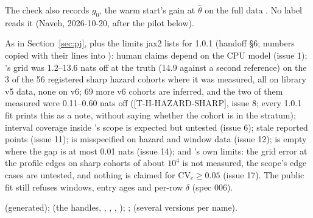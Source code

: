 The check also records $g_0$, the warm start's gain at $\hat\theta$ on the full data . No label reads
it (Naveh, 2026-10-20, after the pilot below).

\tplLimits
As in Section~\ref{sec:pj}, plus the limits jax2 lists for 1.0.1 (handoff \S6; numbers copied with their lines into
): human claims depend on the CPU model (issue 1);
's grid was 1.2--13.6 nats off at the truth (14.9 against a second reference) on the 3 of the 56
registered sharp hazard cohorts where it was measured, all on library v5 data, none on v6; 69 more v6 cohorts are
inferred, and the two of them measured were 0.11--0.60 nats off ([T-H-HAZARD-SHARP], issue 8; every  1.0.1 fit
prints this as a note, without saying whether the cohort is in the stratum); interval coverage inside 's
scope is expected but untested (issue 6); stale reported points (issue 11);  is misspecified on hazard and window data (issue 12);
 is empty where the gap is at most 0.01 nats (issue 14); and 's own limits: the
grid error at the profile edges on sharp cohorts of about $10^4$ is not measured, the scope's edge cases are untested,
and nothing is claimed for $\mathrm{CV}_c\ge0.05$ (issue 17). The public fit still refuses windows, entry ages and
per-row $\delta$ (spec 006).

\tplWhere
{} (generated);  (the handles, ,
, , ); ; 
(several versions per name).

